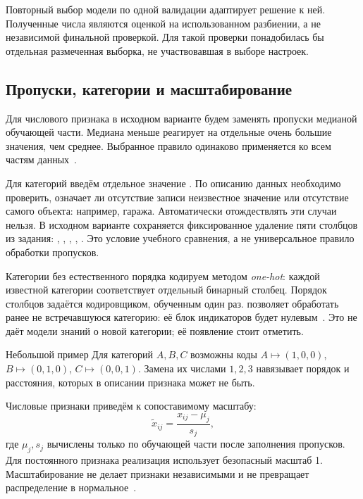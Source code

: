 Повторный выбор модели по одной валидации адаптирует решение к ней.
Полученные числа являются оценкой на использованном разбиении, а не
независимой финальной проверкой. Для такой проверки понадобилась бы
отдельная размеченная выборка, не участвовавшая в выборе настроек.

\subsection{Пропуски, категории и масштабирование}
Для числового признака в исходном варианте будем заменять пропуски
медианой обучающей части. Медиана меньше реагирует на отдельные очень
большие значения, чем среднее. Выбранное правило одинаково применяется
ко всем частям данных~\cite{imputer}.

Для категорий введём отдельное значение .
По описанию данных необходимо проверить, означает ли отсутствие записи
неизвестное значение или отсутствие самого объекта: например, гаража.
Автоматически отождествлять эти случаи нельзя. В исходном варианте
сохраняется фиксированное удаление пяти столбцов из задания:
, , , ,
. Это условие учебного сравнения, а не универсальное
правило обработки пропусков.

Категории без естественного порядка кодируем методом \textit{one-hot}:
каждой известной категории соответствует отдельный бинарный столбец.
Порядок столбцов задаётся кодировщиком, обученным один раз.
 позволяет обработать ранее не встречавшуюся
категорию: её блок индикаторов будет нулевым~\cite{onehot}.
Это не даёт модели знаний о новой категории; её появление стоит отметить.

\begin{keybox}{Небольшой пример}
Для категорий \(A,B,C\) возможны коды
\(A\mapsto(1,0,0)\), \(B\mapsto(0,1,0)\),
\(C\mapsto(0,0,1)\). Замена их числами \(1,2,3\) навязывает
порядок и расстояния, которых в описании признака может не быть.
\end{keybox}

Числовые признаки приведём к сопоставимому масштабу:
\begin{equation}
\widetilde x_{ij}=\frac{x_{ij}-\mu_j}{s_j},
\end{equation}
где \(\mu_j,s_j\) вычислены только по обучающей части после заполнения
пропусков. Для постоянного признака реализация использует безопасный
масштаб 1. Масштабирование не делает признаки независимыми и не
превращает распределение в нормальное~\cite{scaler}.

